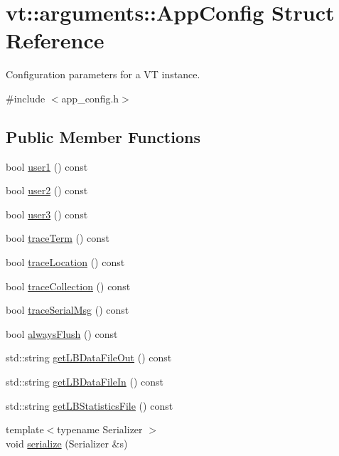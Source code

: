 \hypertarget{structvt_1_1arguments_1_1_app_config}{}\section{vt\+:\+:arguments\+:\+:App\+Config Struct Reference}
\label{structvt_1_1arguments_1_1_app_config}


Configuration parameters for a VT instance.  




{\ttfamily \#include $<$app\+\_\+config.\+h$>$}

\subsection*{Public Member Functions}
\begin{DoxyCompactItemize}
\item 
bool \hyperlink{structvt_1_1arguments_1_1_app_config_a2f94b5667c784de4398cb27110555e86}{user1} () const
\item 
bool \hyperlink{structvt_1_1arguments_1_1_app_config_ab504a2952d75b3f1fa9d81e8122cbc41}{user2} () const
\item 
bool \hyperlink{structvt_1_1arguments_1_1_app_config_ad11c798fedeafd2d5ec3f6737226afad}{user3} () const
\item 
bool \hyperlink{structvt_1_1arguments_1_1_app_config_afbe5bc2d7e470809bc204a30158ba96e}{trace\+Term} () const
\item 
bool \hyperlink{structvt_1_1arguments_1_1_app_config_a3a3b55a1c4f5a6b001e346d8b5ce084a}{trace\+Location} () const
\item 
bool \hyperlink{structvt_1_1arguments_1_1_app_config_adddc5276b065e2ea1c7a9b0626a8ce0d}{trace\+Collection} () const
\item 
bool \hyperlink{structvt_1_1arguments_1_1_app_config_a81f20c5bbc19af108fd9487e2a98b003}{trace\+Serial\+Msg} () const
\item 
bool \hyperlink{structvt_1_1arguments_1_1_app_config_adea8d58f81c4df7df475ac9f7780decc}{always\+Flush} () const
\item 
std\+::string \hyperlink{structvt_1_1arguments_1_1_app_config_a82e5247ad3ad6c2712dd31a2f5ff776f}{get\+L\+B\+Data\+File\+Out} () const
\item 
std\+::string \hyperlink{structvt_1_1arguments_1_1_app_config_aa0c962a874e2ab3a73db4fcd22b0c988}{get\+L\+B\+Data\+File\+In} () const
\item 
std\+::string \hyperlink{structvt_1_1arguments_1_1_app_config_a71ee368fd763047fdd2040834c229151}{get\+L\+B\+Statistics\+File} () const
\item 
{\footnotesize template$<$typename Serializer $>$ }\\void \hyperlink{structvt_1_1arguments_1_1_app_config_af328ae786d91e9efb5f92d6a00b1cde1}{serialize} (Serializer \&s)
\end{DoxyCompactItemize}
